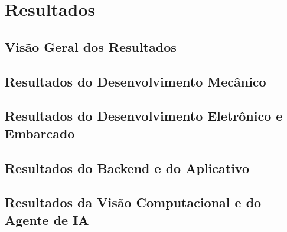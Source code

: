
\chapter{Resultados}
\label{chap:resultados}


\section{Visão Geral dos Resultados}
\label{sec:visao-geral-resultados}


\section{Resultados do Desenvolvimento Mecânico}
\label{sec:resultados-mecanicos}


\section{Resultados do Desenvolvimento Eletrônico e Embarcado}
\label{sec:resultados-eletronicos-embarcados}


\section{Resultados do Backend e do Aplicativo}
\label{sec:resultados-backend-aplicativo}


\section{Resultados da Visão Computacional e do Agente de IA}
\label{sec:resultados-visao-ia}

